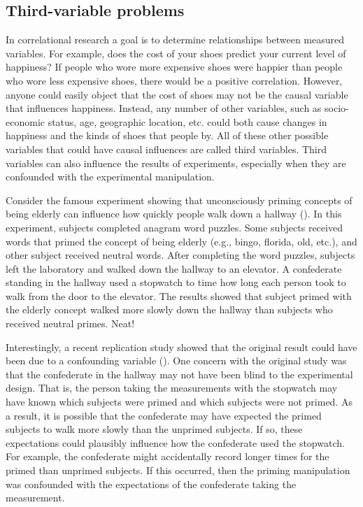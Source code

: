 \subsection{Third-variable problems}

In correlational research a goal is to determine relationships between measured variables. For example, does the cost of your shoes predict your current level of happiness? If people who wore more expensive shoes were happier than people who wore less expensive shoes, there would be a positive correlation. However, anyone could easily object that the cost of shoes may not be the causal variable that influences happiness. Instead, any number of other variables, such as socio-economic status, age, geographic location, etc. could both cause changes in happiness and the kinds of shoes that people by. All of these other possible variables that could have causal influences are called third variables. Third variables can also influence the results of experiments, especially when they are confounded with the experimental manipulation.

Consider the famous experiment showing that unconsciously priming concepts of being elderly can influence how quickly people walk down a hallway (). In this experiment, subjects completed anagram word puzzles. Some subjects received words that primed the concept of being elderly (e.g., bingo, florida, old, etc.), and other subject received neutral words. After completing the word puzzles, subjects left the laboratory and walked down the hallway to an elevator. A confederate standing in the hallway used a stopwatch to time how long each person took to walk from the door to the elevator. The results showed that subject primed with the elderly concept walked more slowly down the hallway than subjects who received neutral primes. Neat!

Interestingly, a recent replication study showed that the original result could have been due to a confounding variable (). One concern with the original study was that the confederate in the hallway may not have been blind to the experimental design. That is, the person taking the measurements with the stopwatch may have known which subjects were primed and which subjects were not primed. As a result, it is possible that the confederate may have expected the primed subjects to walk more slowly than the unprimed subjects. If so, these expectations could plausibly influence how the confederate used the stopwatch. For example, the confederate might accidentally record longer times for the primed than unprimed subjects. If this occurred, then the priming manipulation was confounded with the expectations of the confederate taking the measurement. 

